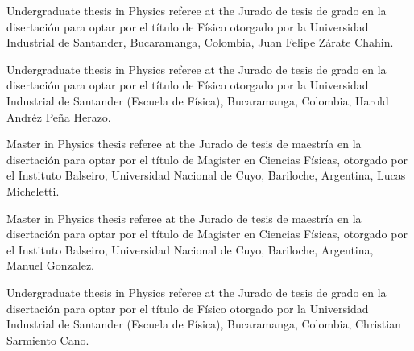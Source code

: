 \ifeng
Undergraduate thesis in Physics referee at the  
\else
Jurado de tesis de grado en la disertación para optar por el título de Físico otorgado por la 
\fi
Universidad Industrial de Santander, Bucaramanga, Colombia, Juan Felipe Zárate Chahin.

\ifeng
Undergraduate thesis in Physics referee at the  
\else
Jurado de tesis de grado en la disertación para optar por el título de Físico otorgado por la 
\fi
Universidad Industrial de Santander (Escuela de Física), Bucaramanga, Colombia, Harold Andréz Peña Herazo.

\ifeng
Master in Physics thesis referee at the
\else
Jurado de tesis de maestría en la disertación para optar por el título de Magister en Ciencias Físicas, otorgado por el 
\fi
Instituto Balseiro, Universidad Nacional de Cuyo, Bariloche, Argentina, Lucas Micheletti.

\ifeng
Master in Physics thesis referee at the
\else
Jurado de tesis de maestría en la disertación para optar por el título de Magister en Ciencias Físicas, otorgado por el 
\fi
Instituto Balseiro, Universidad Nacional de Cuyo, Bariloche, Argentina, Manuel Gonzalez.

\ifeng
Undergraduate thesis in Physics referee at the  
\else
Jurado de tesis de grado en la disertación para optar por el título de Físico otorgado por la 
\fi
Universidad Industrial de Santander (Escuela de Física), Bucaramanga, Colombia, Christian Sarmiento Cano.

